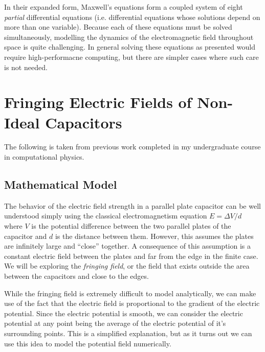 \documentclass{report}
\begin{document}
    In their expanded form, Maxwell's equations form a coupled system of eight \emph{partial} differential equations (i.e. differential equations whose solutions depend on more than one variable).  Because each of these equations must be solved simultaneously, modelling the dynamics of the electromagnetic field throughout space is quite challenging.  In general solving these equations as presented would require high-performacne computing, but there are simpler cases where such care is not needed.

\pagebreak

    \section{Fringing Electric Fields of Non-Ideal Capacitors}

            The following is taken from previous work\cite{fringingfieldsBealeChapman2019} completed in my undergraduate course in computational physics.

        \subsection{Mathematical Model}

            The behavior of the electric field strength in a parallel plate capacitor can be well understood simply using the classical electromagnetism equation $E = \Delta V / d$ where $V$ is the potential difference between the two parallel plates of the capacitor and $d$ is the distance between them. However, this assumes the plates are infinitely large and ``close'' together.  A consequence of this assumption is a constant electric field between the plates and far from the edge in the finite case. We will be exploring the \emph{fringing field}, or the field that exists outside the area between the capacitors and close to the edges.

            While the fringing field is extremely difficult to model analytically, we can make use of the fact that the electric field is proportional to the gradient of the electric potential.  Since the electric potential is smooth, we can consider the electric potential at any point being the average of the electric potential of it's surrounding points. This is a simplified explanation, but as it turns out we can use this idea to model the potential field numerically.
\end{document}
